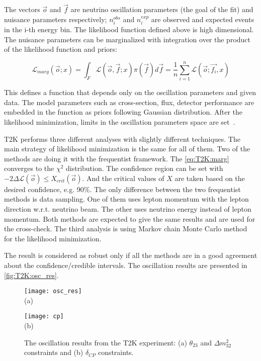 \documentclass[../main.tex]{subfiles}
\begin{document}
The vectors $\overrightarrow{o}$ and $\overrightarrow{f}$ are neutrino oscillation parameters (the goal of the fit) and nuisance parameters respectively; $n_i^{obs}$ and $n_i^{exp}$ are observed and expected events in the i-th energy bin. The likelihood function defined above is high dimensional. The nuisance parameters can be marginalized with integration over the product of the likelihood function and priors:

\begin{equation}
\mathcal{L}_{marg}\left(\overrightarrow{o}; x\right)=\int_F\mathcal{L}\left(\overrightarrow{o},\overrightarrow{f};x\right)\pi(\overrightarrow{f})d\overrightarrow{f}=\frac{1}{n}\sum_{i=1}^{n}\mathcal{L}\left(\overrightarrow{o}; \overrightarrow{f_i}, x\right)
\label{eq:T2K:marg}
\end{equation}

This defines a function that depends only on the oscillation parameters and given data. The model parameters such as cross-section, flux, detector performance are embedded in the function as priors following Gaussian distribution. After the likelihood minimization, limits in the oscillation parameters space are set~\cite{Cousins1992}.

T2K performs three different analyses with slightly different techniques. The main strategy of likelihood minimization is the same for all of them. Two of the methods are doing it with the frequentist framework. The \autoref{eq:T2K:marg} converges to the $\chi^2$ distribution. The confidence region can be set with $-2\Delta\mathcal{L}(\overrightarrow{o})\leqslant X_{crit}(\overrightarrow{o})$. And the critical values of $X$ are taken based on the desired confidence, e.g. 90\%. The only difference between the two frequentist methods is data sampling. One of them uses lepton momentum with the lepton direction w.r.t. neutrino beam. The other uses neutrino energy instead of lepton momentum. Both methods are expected to give the same results and are used for the cross-check. The third analysis is using Markov chain Monte Carlo method for the likelihood minimization.

The result is considered as robust only if all the methods are in a good agreement about the confidence/credible intervals. The oscillation results are presented in \autoref{fig:T2K:osc_res}.

\begin{figure}[!ht]
  \centering
  \begin{minipage}{0.49\linewidth}
    \centering
    \texttt{[image: osc\_res]} \\ (a)
  \end{minipage}
  \begin{minipage}{0.49\linewidth}
    \centering
    \texttt{[image: cp]} \\ (b)
  \end{minipage}
    \caption{The oscillation results from the T2K experiment: (a) $\theta_{23}$ and $\Delta m_{32}^2$ constraints and (b) $\delta_{CP}$ constraints.}
    \label{fig:T2K:osc_res}
\end{figure}
\end{document}
